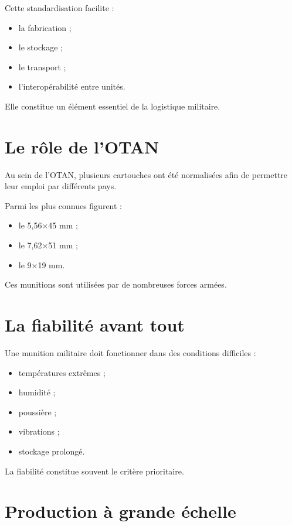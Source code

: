 Cette standardisation facilite :

\begin{itemize}
    \item la fabrication ;
    \item le stockage ;
    \item le transport ;
    \item l'interopérabilité entre unités.
\end{itemize}

Elle constitue un élément essentiel de la logistique militaire.

\section{Le rôle de l'OTAN}

Au sein de l'OTAN, plusieurs cartouches ont été normalisées afin de permettre
leur emploi par différents pays.

Parmi les plus connues figurent :

\begin{itemize}
    \item le 5,56×45 mm ;
    \item le 7,62×51 mm ;
    \item le 9×19 mm.
\end{itemize}

Ces munitions sont utilisées par de nombreuses forces armées.

\section{La fiabilité avant tout}

Une munition militaire doit fonctionner dans des conditions difficiles :

\begin{itemize}
    \item températures extrêmes ;
    \item humidité ;
    \item poussière ;
    \item vibrations ;
    \item stockage prolongé.
\end{itemize}

La fiabilité constitue souvent le critère prioritaire.

\section{Production à grande échelle}

